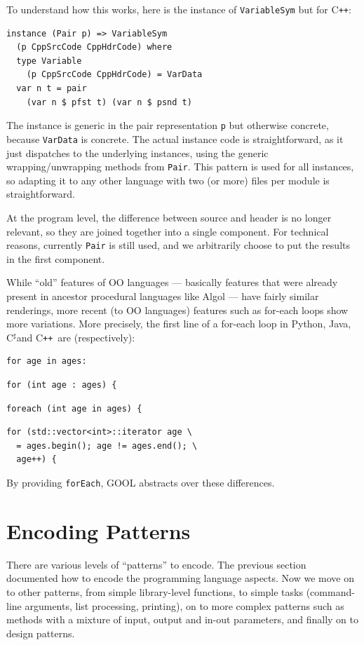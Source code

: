 \documentclass[sigplan,review,anonymous,prologue,dvipsnames]{acmart}
\newcommand{\Csharp}{C$^{\sharp}$}
\newcommand{\Cplusplus}{C\texttt{++}}
\begin{document}
To understand how this works, here is the instance of \verb|VariableSym|
but for \Cplusplus:
\begin{lstlisting}
instance (Pair p) => VariableSym 
  (p CppSrcCode CppHdrCode) where
  type Variable 
    (p CppSrcCode CppHdrCode) = VarData
  var n t = pair 
    (var n $ pfst t) (var n $ psnd t)
\end{lstlisting}
The instance is generic in the pair representation \verb|p| but
otherwise concrete, because \verb|VarData| is concrete. The actual
instance code is straightforward, as it just dispatches to the 
underlying instances, using the generic wrapping/unwrapping
methods from \verb|Pair|.  This pattern is used for all instances,
so adapting it to any other language with two (or more) files per
module is straightforward.

At the program level, the difference between source and header is no
longer relevant, so they are joined together into a single component.
For technical reasons, currently \verb|Pair| is still used, and we arbitrarily
choose to put the results in the first component.

While ``old'' features of OO languages --- basically features that
were already present in ancestor procedural languages like Algol ---
have fairly similar renderings, more recent (to OO languages) features
such as for-each loops show more variations.  More precisely,
the first line of a for-each loop in Python, Java, \Csharp and
\Cplusplus~are (respectively):
\begin{lstlisting}
for age in ages:
\end{lstlisting}
\begin{lstlisting}
for (int age : ages) {
\end{lstlisting}
\begin{lstlisting}
foreach (int age in ages) {
\end{lstlisting}
\begin{lstlisting}
for (std::vector<int>::iterator age \
  = ages.begin(); age != ages.end(); \
  age++) {
\end{lstlisting}
By providing \verb|forEach|, GOOL abstracts over these differences.

\section{Encoding Patterns} \label{sec:patterns}

There are various levels of ``patterns'' to encode. The previous section
documented how to encode the programming language aspects. Now we
move on to other patterns, from simple library-level functions, to
simple tasks (command-line arguments, list processing, printing), on to
more complex patterns such as methods with a mixture of input, output
and in-out parameters, and finally on to design patterns.
\end{document}
